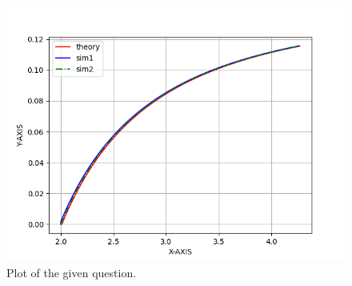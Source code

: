 \documentclass[journal]{IEEEtran}
\begin{document}
\begin{enumerate}
		\begin{figure}[h]
			\centering
			\includegraphics[width=\columnwidth]{figs/fig.png}
			\caption{Plot of the given question.}
			\label{fig:Plot1} 
		\end{figure}
\end{enumerate}
\end{document}
